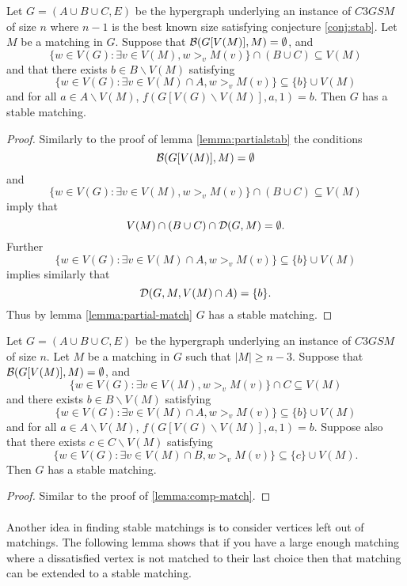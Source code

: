 \begin{lemma}\label{lemma:comp-match}
Let $G=(A\cup B \cup C, E)$ be the hypergraph underlying an instance of $C3GSM$ of size $n$ where $n-1$ is the best known size satisfying conjecture \ref{conj:stab}. Let $M$ be a matching in $G$. Suppose that $\mathcal{B}(G[V(M)], M) = \emptyset$, and 
$$ \{w \in V(G): \exists v \in V(M), w>_v M(v)\} \cap (B \cup C) \subseteq V(M)$$
and that there exists $b \in B\backslash V(M)$ satisfying
$$\{w \in V(G): \exists v \in V(M)\cap A, w>_v M(v)\} \subseteq \{b\} \cup V(M)$$
and for all $a \in A \backslash V(M)$, $f(G[V(G)\backslash V(M)], a, 1) = b$. Then $G$ has a stable matching.
\end{lemma}

\begin{proof}
Similarly to the proof of lemma \ref{lemma:partialstab} the conditions $$\mathcal{B}(G[V(M)], M) = \emptyset$$ and $$\{w \in V(G): \exists v \in V(M), w>_v M(v)\} \cap (B \cup C) \subseteq V(M)$$ imply that $$V(M) \cap (B\cup C) \cap \mathcal{D}(G,M) = \emptyset.$$ Further $$\{w \in V(G): \exists v \in V(M)\cap A, w>_v M(v)\} \subseteq \{b\} \cup V(M)$$ implies similarly that $$\mathcal{D}(G, M, V(M) \cap A) = \{b\}.$$ Thus by lemma \ref{lemma:partial-match} $G$ has a stable matching.
\end{proof}

\begin{lemma}\label{lemma:comp-match-2}
Let $G=(A\cup B \cup C, E)$ be the hypergraph underlying an instance of $C3GSM$ of size $n$. Let $M$ be a matching in $G$ such that $|M| \geq n-3$. Suppose that $\mathcal{B}(G[V(M)],M) = \emptyset$, and
$$\{w \in V(G): \exists v \in V(M), w>_v M(v)\} \cap C \subseteq V(M)$$
and there exists $b \in B \backslash V(M)$ satisfying
$$\{w \in V(G): \exists v \in V(M)\cap A, w>_v M(v)\} \subseteq \{b\} \cup V(M)$$
and for all $a \in A \backslash V(M)$, $f(G[V(G)\backslash V(M)], a, 1) = b$. Suppose also that there exists $c \in C \backslash V(M)$ satisfying
$$\{w \in V(G): \exists v \in V(M)\cap B, w>_v M(v)\} \subseteq \{c\} \cup V(M).$$ 
Then $G$ has a stable matching.
\end{lemma}
\begin{proof}
Similar to the proof of \ref{lemma:comp-match}.
\end{proof}

\paragraph{}
Another idea in finding stable matchings is to consider vertices left out of matchings. The following lemma shows that if you have a large enough matching where a dissatisfied vertex is not matched to their last choice then that matching can be extended to a stable matching. 


